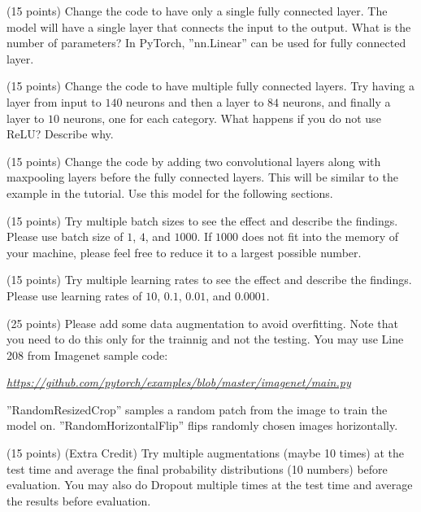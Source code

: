 \documentclass[fleqn]{article}
\begin{document}
\item (15 points) Change the code to have only a single fully connected layer. The model will have a single layer that connects the input to the output. What is the number of parameters? In PyTorch, ''nn.Linear'' can be used for fully connected layer.

\item (15 points) Change the code to have multiple fully connected layers. Try having a layer from input to $140$ neurons and then a layer to $84$ neurons, and finally a layer to $10$ neurons, one for each category. What happens if you do not use ReLU? Describe why.

\item (15 points) Change the code by adding two convolutional layers along with maxpooling layers before the fully connected layers. This will be similar to the example in the tutorial. Use this model for the following sections.

\item (15 points) Try multiple batch sizes to see the effect and describe the findings. Please use batch size of $1$, $4$, and $1000$. If $1000$ does not fit into the memory of your machine, please feel free to reduce it to a largest possible number.

\item (15 points) Try multiple learning rates to see the effect and describe the findings. Please use learning rates of $10$, $0.1$, $0.01$, and $0.0001$.

\item (25 points) Please add some data augmentation to avoid overfitting. Note that you need to do this only for the trainnig and not the testing. You may use Line 208 from Imagenet sample code:

\href{https://github.com/pytorch/examples/blob/master/imagenet/main.py}{\em https://github.com/pytorch/examples/blob/master/imagenet/main.py}

''RandomResizedCrop'' samples a random patch from the image to train the model on. ''RandomHorizontalFlip'' flips randomly chosen images horizontally.

\item (15 points) (Extra Credit) Try multiple augmentations (maybe 10 times) at the test time and average the final probability distributions (10 numbers) before evaluation. You may also do Dropout multiple times at the test time and average the results before evaluation.

\ene
\end{document}

